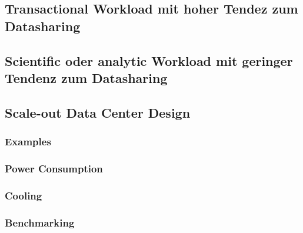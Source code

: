 \documentclass[a4paper]{article}
\begin{document}
\subsection{Transactional Workload mit hoher Tendez zum Datasharing}

\subsection{Scientific oder analytic Workload mit geringer Tendenz zum Datasharing}


\subsection{Scale-out Data Center Design}

\subsubsection{Examples}

\subsubsection{Power Consumption}

\subsubsection{Cooling}

\subsubsection{Benchmarking}
\end{document}
